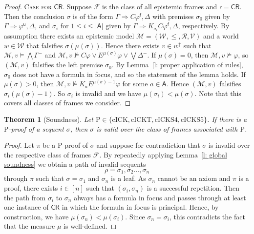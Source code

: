 \documentclass{myifcolog}
\newcommand\C {C}
\newcommand{\K}{K}
\newcommand\A{\mathsf{A}}
\newcommand{\agi}{a}
\newcommand{\E}{E}
\newcommand{\fw}{\mathcal{M}}
\newcommand{\f}{\mathsf{f}}
\renewcommand{\u}{\mathsf{u}}
\newcommand{\W}{\mathcal{W}}
\newcommand{\rel}{\mathcal{R}}
\newcommand{\V}{\mathcal{V}}
\newcommand{\hickp}{\mathrm{P}}
\newcommand{\cick}{\mathrm{cICK}}
\newcommand{\cickt}{\mathrm{cICKT}}
\newcommand{\cicks}{\mathrm{cICKS4}}
\newcommand{\cickss}{\mathrm{cICKS5}}
\newtheorem{theorem}{Theorem}
\numberwithin{theorem}{section}
\begin{document}
\begin{proof}
            \noindent \textsc{Case for $\mathsf{\C R}$.} Suppose $\mathscr{F}$ is the class of all epistemic frames and $\mathsf{r} = \mathsf{CR}$. Then the conclusion $\sigma$ is of the form $\Gamma \Rightarrow \C \varphi^\f, \Delta$ with premises $\sigma_0$ given by $\Gamma \Rightarrow \varphi^\u, \Delta$, and $\sigma_i$ for $1 \leq i \leq \lvert \A \rvert$ given by $\Gamma \Rightarrow \K_{\agi_i}\C \varphi^\f, \Delta$, respectively.  By assumption there exists an epistemic model $\fw = (\W, \leq, \rel, \V)$ and a world $w \in \W$ that falsifies $\sigma(\mu(\sigma))$. Hence there exists ${v \in w^\uparrow}$ such that $\fw,v\models \bigwedge \Gamma^-$ and $\fw,v\not\models \C \varphi \lor \E^{\mu(\sigma)} \varphi\lor \bigvee\Delta^{-}$. If $\mu(\sigma) = 0$, then ${\fw,v \not \models \varphi}$, so $(\fw,v)$ falsifies the left premise $\sigma_0$. By Lemma~\ref{l: proper application of rules}, $\sigma_0$ does not have a formula in focus, and so the statement of the lemma holds. If $\mu(\sigma) > 0$, then $\fw,v \not \models \K_{\agi}\E^{\mu(\sigma) - 1} \varphi$ for some $\agi \in \A$. Hence $(\fw,v)$ falsifies $\sigma_{i}(\mu(\sigma)-1)$. So $\sigma_i$ is invalid and we have  $\mu(\sigma_i) < \mu(\sigma)$. Note that this covers all classes of frames we consider.
\end{proof}



\begin{theorem}[Soundness]\label{t: CIM soundness}
   Let $\hickp \in \{\cick, \cickt, \cicks, \cickss\}$. If there is a $\hickp$-proof of a sequent $\sigma$, then $\sigma$ is valid over the class of frames associated with $\hickp$.
\end{theorem}
\begin{proof}
    Let $\pi$ be a $\hickp$-proof of $\sigma$ and suppose for contradiction that $\sigma$ is invalid over the respective class of frames $\mathscr{F}$. By repeatedly applying Lemma~\ref{l: global soundness} we obtain a path of invalid sequents
    \[
        \rho = \sigma_1,\sigma_2 \ldots, \sigma_n
    \]
    through $\pi$ such that $\sigma=\sigma_1$ and  $\sigma_n$ is a leaf. As $\sigma_n$ cannot be an axiom and $\pi$ is a proof, there exists $i \in [n]$ such that $(\sigma_i, \sigma_n)$ is a successful repetition. Then the path from $\sigma_i$ to $\sigma_n$ always has a formula in focus and passes through at least one instance of $\mathsf{\C R}$ in which the formula in focus is principal. Hence, by construction, we have $\mu(\sigma_n) < \mu(\sigma_i)$. Since $\sigma_n=\sigma_i$, this contradicts the fact that the measure $\mu$ is well-defined. 
\end{proof}
\end{document}
